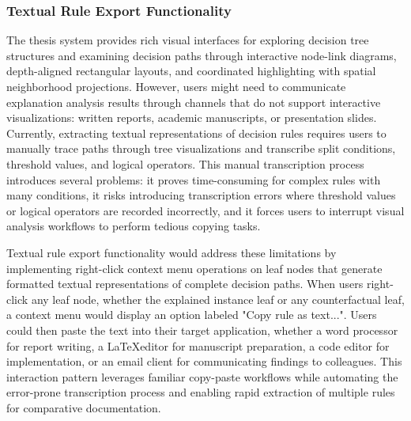 \subsubsection{Textual Rule Export Functionality}

The thesis system provides rich visual interfaces for exploring decision tree structures and examining decision paths through interactive node-link diagrams, depth-aligned rectangular layouts, and coordinated highlighting with spatial neighborhood projections. However, users might need to communicate explanation analysis results through channels that do not support interactive visualizations: written reports, academic manuscripts, or presentation slides. Currently, extracting textual representations of decision rules requires users to manually trace paths through tree visualizations and transcribe split conditions, threshold values, and logical operators. This manual transcription process introduces several problems: it proves time-consuming for complex rules with many conditions, it risks introducing transcription errors where threshold values or logical operators are recorded incorrectly, and it forces users to interrupt visual analysis workflows to perform tedious copying tasks.

Textual rule export functionality would address these limitations by implementing right-click context menu operations on leaf nodes that generate formatted textual representations of complete decision paths. When users right-click any leaf node, whether the explained instance leaf or any counterfactual leaf, a context menu would display an option labeled "Copy rule as text...". Users could then paste the text into their target application, whether a word processor for report writing, a \LaTeX editor for manuscript preparation, a code editor for implementation, or an email client for communicating findings to colleagues. This interaction pattern leverages familiar copy-paste workflows while automating the error-prone transcription process and enabling rapid extraction of multiple rules for comparative documentation.

